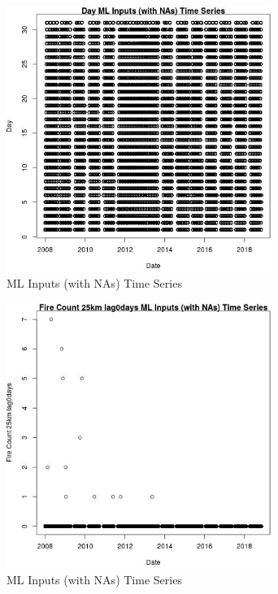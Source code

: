 \begin{figure} 
\centering  
\includegraphics[width=0.77\textwidth]{Code_Outputs/Report_ML_input_PM25_Step4_part_e_de_duplicated_aves_compiled_2019-05-20wNAs_DayvDate.jpg} 
\caption{\label{fig:Report_ML_input_PM25_Step4_part_e_de_duplicated_aves_compiled_2019-05-20wNAsDayvDate}ML Inputs (with NAs) Time Series} 
\end{figure} 
 

\begin{figure} 
\centering  
\includegraphics[width=0.77\textwidth]{Code_Outputs/Report_ML_input_PM25_Step4_part_e_de_duplicated_aves_compiled_2019-05-20wNAs_Fire_Count_25km_lag0daysvDate.jpg} 
\caption{\label{fig:Report_ML_input_PM25_Step4_part_e_de_duplicated_aves_compiled_2019-05-20wNAsFire_Count_25km_lag0daysvDate}ML Inputs (with NAs) Time Series} 
\end{figure} 
 

